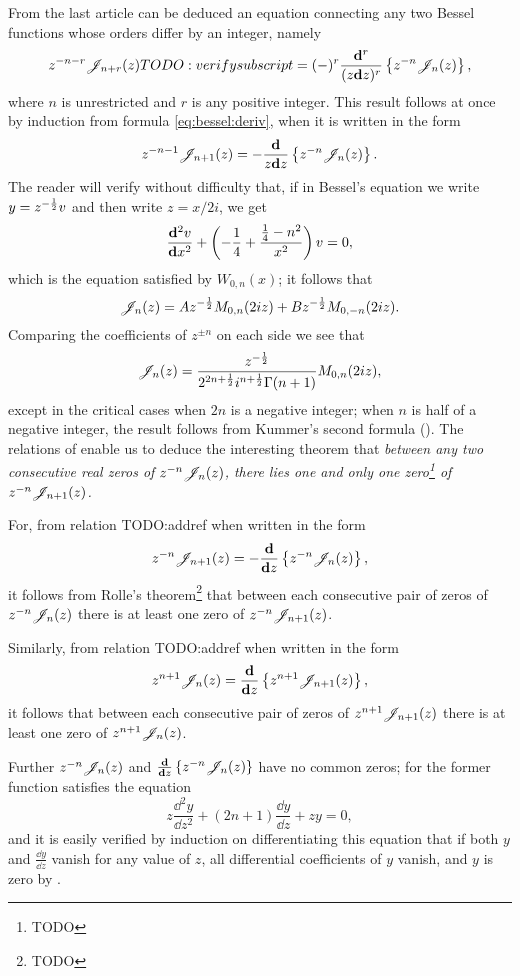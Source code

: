 From the last article can be deduced an equation connecting any two
Bessel functions whose orders differ by an integer, namely
$$
z^{-n-r} \mathscr{J}_{n+r}(z) TODO: verify subscript
=
(-)^{r}
\frac{\mathbf{d}^{r}}{ (z \mathbf{d} z)^{r} }
\left\{  z^{-n} \mathscr{J}_{n}(z)   \right\},
$$
where $n$ is unrestricted and $r$ is any positive integer. This result
follows at once by induction from formula \eqref{eq:bessel:deriv},
when it is written in the form
$$
z^{-n-1} \mathscr{J}_{n+1}(z) 
=
- \frac{\mathbf{d}}{z \mathbf{d} z}
\left\{  z^{-n} \mathscr{J}_{n}(z)   \right\}.
$$
The reader will verify without difficulty that, if in Bessel's
equation we write $y = z^{-\frac{1}{2}} v$ and then write $z = x/2i$, we get
$$
\frac{\mathbf{d}^{2} v}{\mathbf{d} x^{2}}
+
\left(  -\frac{1}{4} + \frac{\frac{1}{4} - n^{2}}{x^{2}}   \right) v
=
0,
$$
which is the equation satisfied by $W_{0,n}(x)$; it follows that
$$
\mathscr{J}_{n}(z) = A z^{-\frac{1}{2}} M_{0,n}(2iz) + B z^{-\frac{1}{2}} M_{0,-n}(2iz).
$$
Comparing the coefficients of $z^{\pm n}$ on each side we see that
$$
\mathscr{J}_{n}(z) = \frac{z^{-\frac{1}{2}}}{2^{2n+\frac{1}{2}} i^{n+\frac{1}{2}} \Gamma(n+1)} M_{0,n}(2iz),
$$
% 
% 
except in the critical cases when $2n$ is a negative integer; 
when $n$ is half of a negative integer, the result follows from
Kummer's second formula ().
The relations of  enable us to deduce the
interesting theorem that \emph{between any two consecutive real zeros
  of $z^{-n}\mathscr{J}_{n}(z)$, there lies one and only one zero\footnote{TODO}
  of $z^{-n}\mathscr{J}_{n+1}(z)$.}

For, from relation TODO:addref when written in the form
$$
z^{-n} \mathscr{J}_{n+1}(z) 
= 
- \frac{\mathbf{d}}{\mathbf{d} z} \left\{  z^{-n} \mathscr{J}_{n}(z)  \right\},
$$
it follows from Rolle's theorem\footnote{TODO} that between each
consecutive pair of zeros of $z^{-n}\mathscr{J}_{n}(z)$ there is at least one zero
of $z^{-n} \mathscr{J}_{n+1}(z)$.

Similarly, from relation TODO:addref when written in the form
$$
z^{n+1} \mathscr{J}_{n}(z) 
= 
\frac{\mathbf{d}}{\mathbf{d} z} \left\{  z^{n+1} \mathscr{J}_{n+1}(z)  \right\},
$$
it follows that between each consecutive pair of zeros of 
$z^{n+1}\mathscr{J}_{n+1}(z)$ there is at least one zero of 
$z^{n+1}\mathscr{J}_{n}(z)$.

Further $z^{-n}\mathscr{J}_{n}(z)$ and 
$\frac{\mathbf{d}}{\mathbf{d} z} \left\{  z^{-n} \mathscr{J}_{n}(z)   \right\}$ have no common zeros; for
the former function satisfies the equation
$$
z \frac{\dd^{2} y}{\dd z^{2}} + (2n+1) \frac{\dd y}{\dd z} + zy = 0,
$$
and it is easily verified by induction on differentiating this
equation that if both $y$ and $\frac{\dd y}{\dd z}$ vanish for any value of
$z$, all differential coefficients of $y$ vanish, and $y$ is zero by 
.

